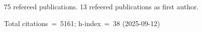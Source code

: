 75 refereed publications. 13 refeered publications as first author.

Total citations~=~5161; h-index~=~38 (2025-09-12)